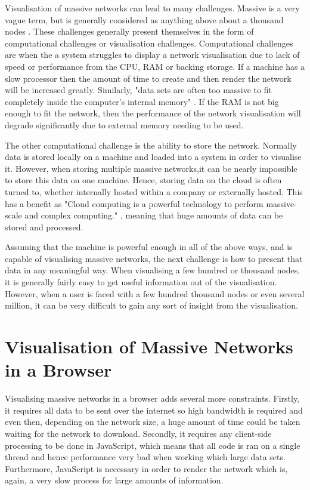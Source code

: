 \documentclass[../dissertation.tex]{subfiles}
\begin{document}
Visualisation of massive networks can lead to many challenges. Massive is a very vague term, but is generally considered as anything above about a thousand nodes \cite{batagelj1998pajek}. These challenges generally present themselves in the form of computational challenges or visualisation challenges. Computational challenges are when the a system struggles to display a network visualisation due to lack of speed or performance from the CPU, RAM or backing storage. If a machine has a slow processor then the amount of time to create and then render the network will be increased greatly. Similarly, "data sets are often too massive to fit completely inside the computer's internal memory" \cite{abello2013handbook}. If the RAM is not big enough to fit the network, then the performance of the network visualisation will degrade significantly due to external memory needing to be used. 

The other computational challenge is the ability to store the network. Normally data is stored locally on a machine and loaded into a system in order to visualise it. However, when storing multiple massive networks,it can be nearly impossible to store this data on one machine. Hence, storing data on the cloud is often turned to, whether internally hosted within a company or externally hosted. This has a benefit as "Cloud computing is a powerful technology to perform massive-scale and complex computing." \cite{hashem2015rise}, meaning that huge amounts of data can be stored and processed.

Assuming that the machine is powerful enough in all of the above ways, and is capable of visualising massive networks, the next challenge is how to present that data in any meaningful way. When visualising a few hundred or thousand nodes, it is generally fairly easy to get useful information out of the visualisation. However, when a user is faced with a few hundred thousand nodes or even several million, it can be very difficult to gain any sort of insight from the visualisation. 

\section{Visualisation of Massive Networks in a Browser}

Visualising massive networks in a browser adds several more constraints. Firstly, it requires all data to be sent over the internet so high bandwidth is required and even then, depending on the network size, a huge amount of time could be taken waiting for the network to download. Secondly, it requires any client-side processing to be done in JavaScript, which means that all code is ran on a single thread and hence performance very bad when working which large data sets. Furthermore, JavaScript is necessary in order to render the network which is, again, a very slow process for large amounts of information. 
\end{document}
